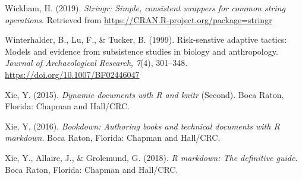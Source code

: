 \documentclass[british,,doc,mask,floatsintext]{apa6}
\begin{document}
\leavevmode\hypertarget{ref-R-stringr}{}%
Wickham, H. (2019). \emph{Stringr: Simple, consistent wrappers for common string operations}. Retrieved from \url{https://CRAN.R-project.org/package=stringr}

\leavevmode\hypertarget{ref-Winterhalder1999}{}%
Winterhalder, B., Lu, F., \& Tucker, B. (1999). Risk-senstive adaptive tactics: Models and evidence from subsistence studies in biology and anthropology. \emph{Journal of Archaeological Research}, \emph{7}(4), 301--348. \url{https://doi.org/10.1007/BF02446047}

\leavevmode\hypertarget{ref-R-knitr}{}%
Xie, Y. (2015). \emph{Dynamic documents with R and knitr} (Second). Boca Raton, Florida: Chapman and Hall/CRC.

\leavevmode\hypertarget{ref-R-bookdown}{}%
Xie, Y. (2016). \emph{Bookdown: Authoring books and technical documents with R markdown}. Boca Raton, Florida: Chapman and Hall/CRC.

\leavevmode\hypertarget{ref-R-rmarkdown}{}%
Xie, Y., Allaire, J., \& Grolemund, G. (2018). \emph{R markdown: The definitive guide}. Boca Raton, Florida: Chapman and Hall/CRC.
\end{document}
